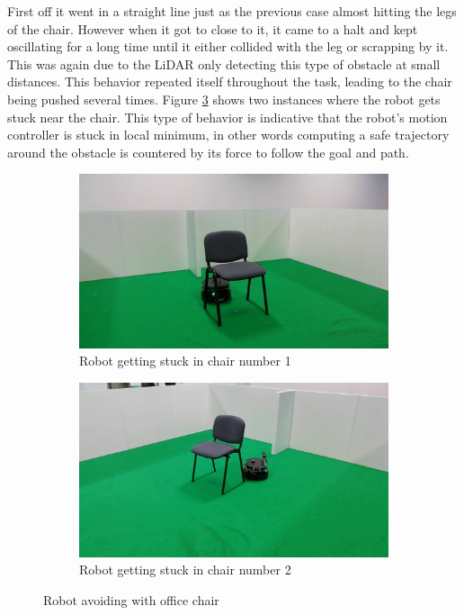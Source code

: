 First off it went in a straight line just as the previous case almost hitting  the legs of the chair. However when it got to close to it, it came to a halt and kept oscillating for a long time until it either collided with the leg or scrapping by it. This was again due to the \ac{LiDAR} only detecting this type of obstacle at small distances. This behavior repeated itself throughout the task, leading to the chair being pushed several times. Figure \ref{fig:wchairLF} shows two instances where the robot gets stuck near the chair. This type of behavior is indicative that the robot's motion controller is stuck in local minimum, in other words computing a safe trajectory around the obstacle is countered by its force to follow the goal and path.
\begin{figure}[h!]
  \centering
  \begin{subfigure}[b]{0.49\linewidth}
    \includegraphics[width=\linewidth]{imgs/chapter5/nchairLF.png}
     \caption{Robot getting stuck in chair number 1}
     \label{fig::wchair}
  \end{subfigure}
  \begin{subfigure}[b]{0.49\linewidth}
    \includegraphics[width=\linewidth]{imgs/chapter5/nchairLF2.png}
    \caption{Robot getting stuck in chair number 2}
    \label{fig::nchair}
  \end{subfigure}
  \caption{Robot avoiding with office chair}
  \label{fig:wchairLF}
\end{figure}

